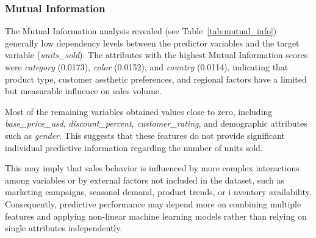 \documentclass[12pt]{article}
\begin{document}
\subsubsection{Mutual Information}

The Mutual Information analysis revealed (see Table~\ref{tab:mutual_info}) generally low dependency levels between the predictor variables and the target variable (\textit{units\_sold}). The attributes with the highest Mutual Information scores were \textit{category} (0.0173), \textit{color} (0.0152), and \textit{country} (0.0114), indicating that product type, customer aesthetic preferences, and regional factors have a limited but measurable influence on sales volume.


Most of the remaining variables obtained values close to zero, including \textit{base\_price\_usd}, \textit{discount\_percent}, \textit{customer\_rating}, and demographic attributes such as \textit{gender}. This suggests that these features do not provide significant individual predictive information regarding the number of units sold.

This may imply that sales behavior is influenced by more complex interactions among variables or by external factors not included in the dataset, such as marketing campaigns, seasonal demand, product trends, or i    nventory availability. Consequently, predictive performance may depend more on combining multiple features and applying non-linear machine learning models rather than relying on single attributes independently.
\end{document}
